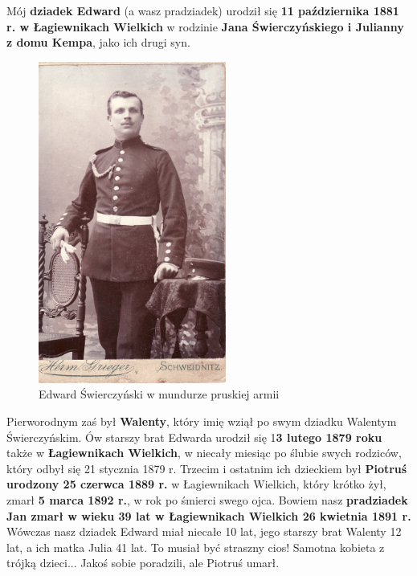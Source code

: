 Mój \textbf{dziadek Edward} (a wasz pradziadek) urodził się \textbf{11 października 1881 r. w Łagiewnikach Wielkich} w rodzinie \textbf{Jana Świerczyńskiego i Julianny z domu Kempa}, jako ich drugi syn.


\begin{figure}[!h]
\begin{center}
\includegraphics[width=0.55\textwidth]{photo/edward_swierczynski_1.jpg}
\caption[Edward Świerczyński]{Edward Świerczyński w mundurze pruskiej armii}
\end{center}
\end{figure}

Pierworodnym zaś był \textbf{Walenty}, który imię wziął po swym dziadku Walentym Świerczyńskim. Ów starszy brat Edwarda urodził się 1\textbf{3 lutego 1879 roku} także w \textbf{Łagiewnikach Wielkich}, w niecały miesiąc po ślubie swych rodziców, który odbył się 21 stycznia 1879 r. Trzecim i ostatnim ich dzieckiem był \textbf{Piotruś urodzony 25 czerwca 1889 r.} w Łagiewnikach Wielkich, który krótko żył, zmarł \textbf{5 marca 1892 r.}, w rok po śmierci swego ojca. Bowiem nasz \textbf{pradziadek Jan zmarł w wieku 39 lat w Łagiewnikach Wielkich 26 kwietnia 1891 r.} Wówczas nasz dziadek Edward miał niecałe 10 lat, jego starszy brat Walenty 12 lat, a ich matka Julia 41 lat. To musiał być straszny cios! Samotna kobieta z trójką dzieci... Jakoś sobie poradzili, ale Piotruś umarł.

